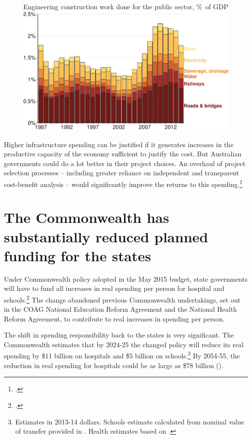 \begin{figure}
%
{Engineering construction work done for the public sector, \%\ of GDP}
\includegraphics[width=\columnwidth]{Fiscal-challenges/figure/Figure14-1.pdf}

\end{figure}

Higher infrastructure spending can be justified if it generates increases in the productive capacity of the economy sufficient to justify the cost. But Australian governments could do a lot better in their project choices. An overhaul of project selection processes – including greater reliance on independent and transparent cost-benefit analysis – would significantly improve the returns to this spending.\footcite{ProductivityCommission2013PublicInfrastructure} 

\section{The Commonwealth has substantially reduced planned funding for the states\label{sec:FISCAL-4-3}}
Under Commonwealth policy adopted in the May 2015 budget, state governments will have to fund all increases in real spending per person for hospital and schools.\footcite[][BP~No.~2, p.~126]{Treasury2014-Budget-Papers-2014-15}  The change abandoned previous Commonwealth undertakings, set out in the COAG National Education Reform Agreement and the National Health Reform Agreement, to contribute to real increases in spending per person.

The shift in spending responsibility back to the states is very significant. The Commonwealth estimates that by 2024-25 the changed policy will reduce its real spending by \$11 billion on hospitals and \$5 billion on schools.\footnote{Estimates in 2013-14 dollars. Schools estimate calculated from nominal value of transfer provided in \textcite[][Overview, p.~7]{Treasury2014-Budget-Papers-2014-15}. Health estimates based on \textcite{Hockey2015IGR}.}  By 2054-55, the reduction in real spending for hospitals could be as large as \$78 billion ().  

